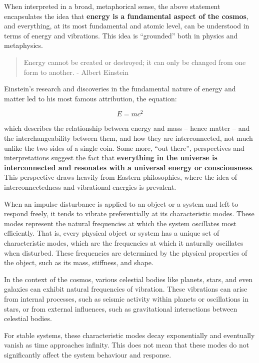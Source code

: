 \documentclass[
  14pt,
  a4paper,
  oneside,
  open=any,
  a4paper,
  14pt]{report}
\begin{document}
When interpreted in a broad, metaphorical sense, the above statement
encapsulates the idea that \textbf{energy is a fundamental aspect of the
cosmos}, and everything, at its most fundamental and atomic level, can
be understood in terms of energy and vibrations. This idea is
``grounded'' both in physics and metaphysics.

\begin{quote}
Energy cannot be created or destroyed; it can only be changed from one
form to another. - Albert Einstein
\end{quote}

Einstein's research and discoveries in the fundamental nature of energy
and matter led to his most famous attribution, the equation:

\[
    E = mc^2
\]

which describes the relationship between energy and mass -- hence matter
-- and the interchangeability between them, and how they are
interconnected, not much unlike the two sides of a single coin. Some
more, ``out there'', perspectives and interpretations suggest the fact
that \textbf{everything in the universe is interconnected and resonates
with a universal energy or consciousness}. This perspective draws
heavily from Eastern philosophies, where the idea of interconnectedness
and vibrational energies is prevalent.

When an impulse disturbance is applied to an object or a system and left
to respond freely, it tends to vibrate preferentially at its
characteristic modes. These modes represent the natural frequencies at
which the system oscillates most efficiently. That is, every physical
object or system has a unique set of characteristic modes, which are the
frequencies at which it naturally oscillates when disturbed. These
frequencies are determined by the physical properties of the object,
such as its mass, stiffness, and shape.

In the context of the cosmos, various celestial bodies like planets,
stars, and even galaxies can exhibit natural frequencies of vibration.
These vibrations can arise from internal processes, such as seismic
activity within planets or oscillations in stars, or from external
influences, such as gravitational interactions between celestial bodies.

For stable systems, these characteristic modes decay exponentially and
eventually vanish as time approaches infinity. This does not mean that
these modes do not significantly affect the system behaviour and
response.
\end{document}

